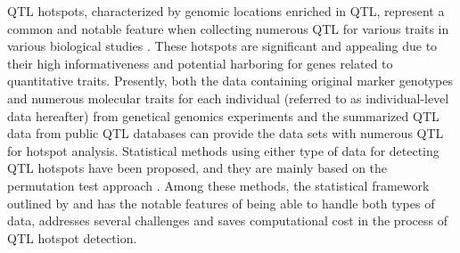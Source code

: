 QTL hotspots, characterized by genomic locations enriched in QTL, represent a common and notable feature when collecting numerous QTL for various traits in various biological studies \citep{Chardon-2004, West-2007, Breitling-2008, Wu-2008, Yang-2019, Meng-2024}. These hotspots are significant and appealing due to their high informativeness and potential harboring for genes related to quantitative traits. Presently, both the data containing original marker genotypes and numerous molecular traits for each individual (referred to as individual-level data hereafter) from genetical genomics experiments and the summarized QTL data from public QTL databases can provide the data sets with numerous QTL for hotspot analysis. Statistical methods using either type of data for detecting QTL hotspots have been proposed, and they are mainly based on the permutation test approach \citep{Wu-2008, Li-2010, Breitling-2008, Neto-2012, Yang-2019, Wu-2021}. Among these methods, the statistical framework outlined by \citet{Yang-2019} and \citet{Wu-2021} has the notable features of being able to handle both types of data, addresses several challenges and saves computational cost in the process of QTL hotspot detection.


